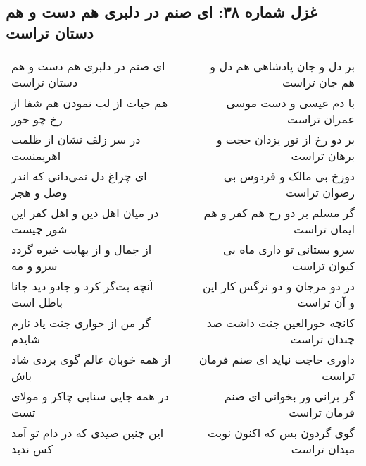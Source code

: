 \begin{center}
\section*{غزل شماره ۳۸: ای صنم در دلبری هم دست و هم دستان تراست}
\label{sec:038}
\begin{longtable}{l p{0.5cm} r}
ای صنم در دلبری هم دست و هم دستان تراست
&&
بر دل و جان پادشاهی هم دل و هم جان تراست
\\
هم حیات از لب نمودن هم شفا از رخ چو حور
&&
با دم عیسی و دست موسی عمران تراست
\\
در سر زلف نشان از ظلمت اهریمنست
&&
بر دو رخ از نور یزدان حجت و برهان تراست
\\
ای چراغ دل نمی‌دانی که اندر وصل و هجر
&&
دوزخ بی مالک و فردوس بی رضوان تراست
\\
در میان اهل دین و اهل کفر این شور چیست
&&
گر مسلم بر دو رخ هم کفر و هم ایمان تراست
\\
از جمال و از بهایت خیره گردد سرو و مه
&&
سرو بستانی تو داری ماه بی کیوان تراست
\\
آنچه بت‌گر کرد و جادو دید جانا باطل است
&&
در دو مرجان و دو نرگس کار این و آن تراست
\\
گر من از حواری جنت یاد نارم شایدم
&&
کانچه حورالعین جنت داشت صد چندان تراست
\\
از همه خوبان عالم گوی بردی شاد باش
&&
داوری حاجت نیاید ای صنم فرمان تراست
\\
در همه جایی سنایی چاکر و مولای تست
&&
گر برانی ور بخوانی ای صنم فرمان تراست
\\
این چنین صیدی که در دام تو آمد کس ندید
&&
گوی گردون بس که اکنون نوبت میدان تراست
\\
\end{longtable}
\end{center}
